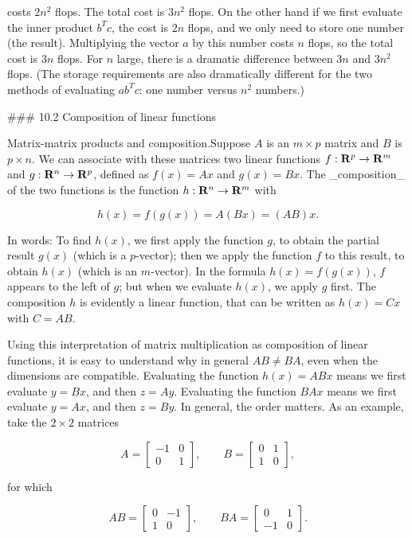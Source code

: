 costs \(2n^{2}\) flops. The total cost is \(3n^{2}\) flops. On the other hand if we first evaluate the inner product \(b^{T}c\), the cost is \(2n\) flops, and we only need to store one number (the result). Multiplying the vector \(a\) by this number costs \(n\) flops, so the total cost is \(3n\) flops. For \(n\) large, there is a dramatic difference between \(3n\) and \(3n^{2}\) flops. (The storage requirements are also dramatically different for the two methods of evaluating \(ab^{T}c\): one number versus \(n^{2}\) numbers.)

### 10.2 Composition of linear functions

Matrix-matrix products and composition.Suppose \(A\) is an \(m\times p\) matrix and \(B\) is \(p\times n\). We can associate with these matrices two linear functions \(f:{\bf R}^{p}\to{\bf R}^{m}\) and \(g:{\bf R}^{n}\to{\bf R}^{p}\), defined as \(f(x)=Ax\) and \(g(x)=Bx\). The _composition_ of the two functions is the function \(h:{\bf R}^{n}\to{\bf R}^{m}\) with

\[h(x)=f(g(x))=A(Bx)=(AB)x.\]

In words: To find \(h(x)\), we first apply the function \(g\), to obtain the partial result \(g(x)\) (which is a \(p\)-vector); then we apply the function \(f\) to this result, to obtain \(h(x)\) (which is an \(m\)-vector). In the formula \(h(x)=f(g(x))\), \(f\) appears to the left of \(g\); but when we evaluate \(h(x)\), we apply \(g\) first. The composition \(h\) is evidently a linear function, that can be written as \(h(x)=Cx\) with \(C=AB\).

Using this interpretation of matrix multiplication as composition of linear functions, it is easy to understand why in general \(AB\neq BA\), even when the dimensions are compatible. Evaluating the function \(h(x)=ABx\) means we first evaluate \(y=Bx\), and then \(z=Ay\). Evaluating the function \(BAx\) means we first evaluate \(y=Ax\), and then \(z=By\). In general, the order matters. As an example, take the \(2\times 2\) matrices

\[A=\left[\begin{array}{cc}-1&0\\ 0&1\end{array}\right],\qquad B=\left[\begin{array}{cc}0&1\\ 1&0\end{array}\right],\]

for which

\[AB=\left[\begin{array}{cc}0&-1\\ 1&0\end{array}\right],\qquad BA=\left[\begin{array}{cc}0&1\\ -1&0\end{array}\right].\]

